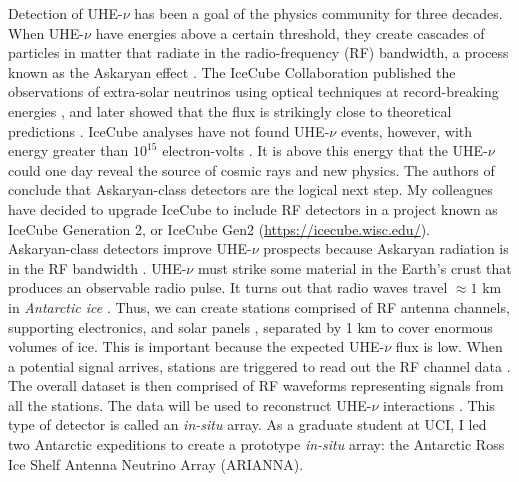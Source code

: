 \documentclass[../../main.tex]{subfiles}
\begin{document}
Detection of UHE-$\nu$ has been a goal of the physics community for three decades.  When UHE-$\nu$ have energies above a certain threshold, they create cascades of particles in matter that radiate in the radio-frequency (RF) bandwidth, a process known as the Askaryan effect \cite{ask1} \cite{ask2} \cite{PhysRevLett.86.2802} \cite{PhysRevLett.99.171101} \cite{PhysRevD.101.083005}.  The IceCube Collaboration published the observations of extra-solar neutrinos using optical techniques at record-breaking energies \cite{PhysRevLett.111.021103}, and later showed that the flux is strikingly close to theoretical predictions \cite{Aartsen_2015} \cite{WB}.  IceCube analyses have not found UHE-$\nu$ events, however, with energy greater than $10^{15}$ electron-volts \cite{PhysRevD.98.062003}.  It is above this energy that the UHE-$\nu$ could one day reveal the source of cosmic rays and new physics.  The authors of \cite{PhysRevD.98.062003} conclude that Askaryan-class detectors are the logical next step.  My colleagues have decided to upgrade IceCube to include RF detectors in a project known as IceCube Generation 2, or IceCube Gen2 (\url{https://icecube.wisc.edu/}).
\\
\vspace{0.25cm}
Askaryan-class detectors improve UHE-$\nu$ prospects because Askaryan radiation is in the RF bandwidth \cite{10.1016/j.astropartphys.2017.03.008}.  UHE-$\nu$ must strike some material in the Earth's crust that produces an observable radio pulse.  It turns out that radio waves travel $\approx 1$ km in \textit{Antarctic ice} \cite{10.3189/2015jog14j214} \cite{10.3189/2015jog15j057} \cite{barwick_besson_gorham_saltzberg_2005}.  Thus, we can create stations comprised of RF antenna channels, supporting electronics, and solar panels \cite{10.1109/tns.2015.2468182}, separated by 1 km to cover enormous volumes of ice.  This is important because the expected UHE-$\nu$ flux is low.  When a potential signal arrives, stations are triggered to read out the RF channel data \cite{sst}.  The overall dataset is then comprised of RF waveforms representing signals from all the stations.  The data will be used to reconstruct UHE-$\nu$ interactions \cite{10.1088/1475-7516/2019/11/030} \cite{10.1088/1748-0221/15/09/p09039}.  This type of detector is called an \textit{in-situ} array.  As a graduate student at UCI, I led two Antarctic expeditions to create a prototype \textit{in-situ} array: the Antarctic Ross Ice Shelf Antenna Neutrino Array (ARIANNA).
\\
\vspace{0.25cm}
\end{document}
